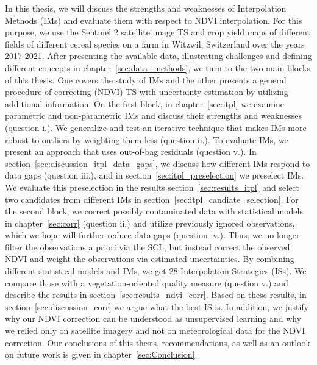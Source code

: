 In this thesis, we will discuss the strengths and weaknesses of Interpolation Methods ({{IM}}s) and evaluate them with respect to NDVI interpolation. For this purpose, we use the Sentinel 2 satellite image {TS} and crop yield maps of different fields of different cereal species on a farm in Witzwil, Switzerland over the years 2017-2021. After presenting the available data, illustrating challenges and defining different concepts in chapter~\ref{sec:data_methods}, we turn to the two main blocks of this thesis. One covers the study of IMs and the other presents a general procedure of correcting (NDVI) TS with uncertainty estimation by utilizing additional information.
On the first block, in chapter~\ref{sec:itpl} we examine parametric and non-parametric {{IM}}s and discuss their strengths and weaknesses (question i.). We generalize and test an iterative technique that makes IMs more robust to outliers by weighting them less (question ii.). To evaluate IMs, we present an approach that uses out-of-bag residuals (question v.). In section~\ref{sec:discussion_itpl_data_gaps}, we discuss how different {{IM}}s respond to data gaps (question iii.), and in section~\ref{sec:itpl_preselection} we preselect {{IM}}s. We evaluate this preselection in the results section~\ref{sec:results_itpl} and select two candidates from different {{IM}}s in section~\ref{sec:itpl_candiate_selection}.
For the second block, we correct possibly contaminated data with statistical models in chapter~\ref{sec:corr} (question ii.) and utilize previously ignored observations, which we hope will further reduce data gaps (question iv.). Thus, we no longer filter the observations a priori via the SCL, but instead correct the observed NDVI and weight the observations via estimated uncertainties. By combining different statistical models and IMs, we get 28 Interpolation Strategies ({{ISs}}). We compare those with a vegetation-oriented quality measure (question v.) and describe the results in section~\ref{sec:results_ndvi_corr}. Based on these results, in section~\ref{sec:discussion_corr} we argue what the best {{IS}} is. In addition, we justify why our NDVI correction can be understood as unsupervised learning and why we relied only on satellite imagery and not on meteorological data for the NDVI correction.
Our conclusions of this thesis, recommendations, as well as an outlook on future work is given in chapter~\ref{sec:Conclusion}. 








